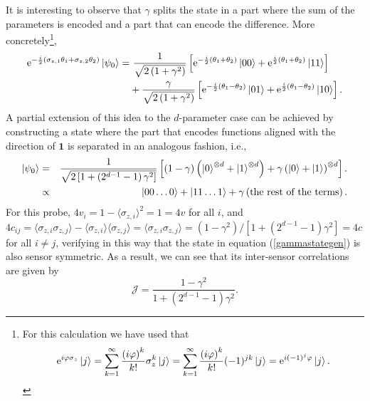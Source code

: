 It is interesting to observe that $\gamma$ splits the state in a part where the sum of the parameters is encoded and a part that can encode the difference. More concretely\footnote{For this calculation we have used that
\begin{equation}
\mathrm{e}^{i\varphi\sigma_z}\ket{j} = \sum_{k=1}^\infty \frac{\left(i\varphi\right)^k}{k!} \sigma_z^k\ket{j} = \sum_{k=1}^\infty \frac{\left(i\varphi\right)^k}{k!} (-1)^{jk}\ket{j} = \mathrm{e}^{i(-1)^j \varphi}\ket{j}.
\nonumber
\end{equation}},
\begin{align}
\mathrm{e}^{-\frac{i}{2}(\sigma_{z,1}\theta_1+\sigma_{z,2}\theta_2)}\ket{\psi_0} = &~ \frac{1}{\sqrt{2\left(1+\gamma^2\right)}}\left[\mathrm{e}^{-\frac{i}{2}(\theta_1 + \theta_2)}\ket{0 0} + \mathrm{e}^{\frac{i}{2}(\theta_1 + \theta_2)}\ket{1 1} \right] 
\nonumber \\
&+ \frac{\gamma}{\sqrt{2\left(1+\gamma^2\right)}}\left[\mathrm{e}^{-\frac{i}{2}(\theta_1 - \theta_2)}\ket{01} + \mathrm{e}^{\frac{i}{2}(\theta_1 - \theta_2)}\ket{10} \right].
\label{twonetworktransformed}
\end{align}
A partial extension of this idea to the $d$-parameter case can be achieved by constructing a state where the part that encodes functions aligned with the direction of $\boldsymbol{1}$ is separated in an analogous fashion, i.e., 
\begin{eqnarray}
\ket{\psi_0} &=& \frac{1}{\sqrt{2\left[1 + \left( 2^{d-1}-1 \right)\gamma^2 \right]}} \left[\left(1-\gamma\right)\left(\ket{0}^{\otimes d} + \ket{1}^{\otimes d}\right) + \gamma \left(\ket{0} + \ket{1} \right)^{\otimes d} \right].
\nonumber \\
&\propto& \ket{0 0 \dots 0} + \ket{1 1 \dots 1} + \gamma \left(\text{the rest of the terms}\right).
\label{gammastategen}
\end{eqnarray}
For this probe, $4v_i = 1 - \langle \sigma_{z,i} \rangle^2 = 1  = 4v$ for all $i$, and $4c_{ij} = \langle \sigma_{z,i} \sigma_{z,j} \rangle - \langle \sigma_{z,i} \rangle\langle \sigma_{z,j} \rangle = \langle \sigma_{z,i} \sigma_{z,j} \rangle = (1-\gamma^2)/[1 + (2^{d-1}-1)\gamma^2] = 4c$ for all $i\neq j$, verifying in this way that the state in equation (\ref{gammastategen}) is also sensor symmetric. As a result, we can see that its inter-sensor correlations are given by
\begin{equation}
\mathcal{J} = \frac{1-\gamma^2}{1 + \left(2^{d-1}-1\right)\gamma^2}.
\label{gengammacorrelations}
\end{equation} 
